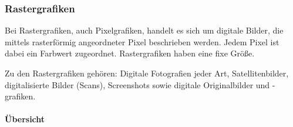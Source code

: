 \subsubsection{Rastergrafiken}

Bei Rastergrafiken, auch Pixelgrafiken, handelt es sich um digitale Bilder, die mittels rasterförmig angeordneter Pixel beschrieben werden. Jedem Pixel ist dabei ein Farbwert zugeordnet. Rastergrafiken haben eine fixe Größe.

Zu den Rastergrafiken gehören: Digitale Fotografien jeder Art, Satellitenbilder, digitalisierte Bilder (Scans), Screenshots sowie digitale Originalbilder und -grafiken.

\paragraph{Übersicht}


